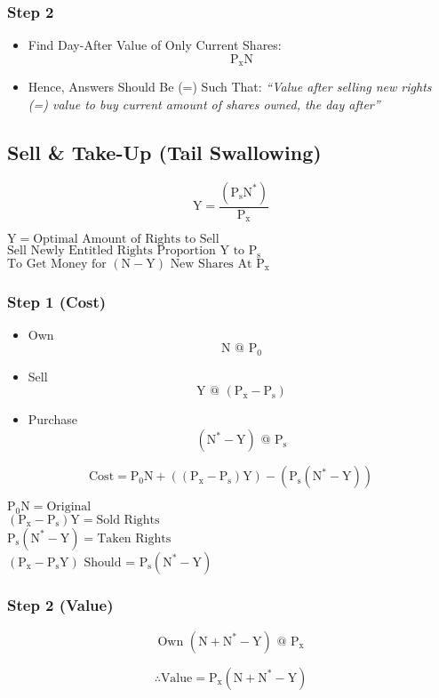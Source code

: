 \documentclass[11pt, english]{article}
\begin{document}
		\subsubsection{Step 2}
	
	\begin{itemize}
		\item Find Day-After Value of Only Current Shares: $$\mathrm{P_xN}$$
		\item Hence, Answers Should Be (=) Such That: \textit{``Value after selling new rights (=) value to buy current amount of shares owned, the day after''}
	\end{itemize}
	
	\subsection{Sell \& Take-Up (Tail Swallowing)}

	$$\mathrm{Y=\frac{(P_sN^*)}{P_x}}$$

	$\mathrm{Y=\textrm{Optimal Amount of Rights to Sell}}$\\
	$\mathrm{\textrm{Sell Newly Entitled Rights Proportion }Y\textrm{ to }P_s}$\\
	$\mathrm{\textrm{To Get Money for }(N-Y)\textrm{ New Shares At }P_x}$

		\subsubsection{Step 1 (Cost)}

	\begin{itemize}                                        
                \item Own $$\mathrm{N\textrm{ @ }P_0}$$
		\item Sell $$\mathrm{Y\textrm{ @ }(P_x-P_s)}$$
		\item Purchase $$\mathrm{(N^*-Y)\textrm{ @ }P_s}$$
	\end{itemize}

	$$\mathrm{\textrm{Cost}=P_0N+((P_x-P_s)Y)-(P_s(N^*-Y))}$$

	$\mathrm{P_0N=\textrm{Original}}$\\
	$\mathrm{(P_x-P_s)Y=\textrm{Sold Rights}}$\\
	$\mathrm{P_s(N^*-Y)=\textrm{Taken Rights}}$\\
	$\mathrm{(P_x-P_sY)\textrm{ Should = }P_s(N^*-Y)}$

		\subsubsection{Step 2 (Value)}

	$$\mathrm{\textrm{Own }(N+N^*-Y)\textrm{ @ }P_x }$$

	$$\mathrm{\therefore\textrm{Value}=P_x(N+N^*-Y)}$$
\end{document}
